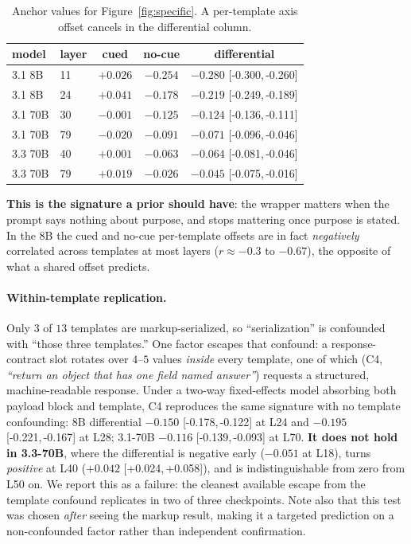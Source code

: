 \documentclass[10pt]{article}
\newcommand{\ci}[2]{{\footnotesize[#1,\,#2]}}
\begin{document}
\begin{table}[t]\centering\small
\caption{Anchor values for Figure~\ref{fig:specific}. A per-template axis offset
cancels in the differential column.}
\label{tab:diff}
\begin{tabular}{llccc}
\toprule
model & layer & cued & no-cue & differential \\
\midrule
3.1 8B  & 11 & $+0.026$ & $-0.254$ & $\mathbf{-0.280}$ \ci{-0.300}{-0.260}\\
3.1 8B  & 24 & $+0.041$ & $-0.178$ & $\mathbf{-0.219}$ \ci{-0.249}{-0.189}\\
3.1 70B & 30 & $-0.001$ & $-0.125$ & $\mathbf{-0.124}$ \ci{-0.136}{-0.111}\\
3.1 70B & 79 & $-0.020$ & $-0.091$ & $\mathbf{-0.071}$ \ci{-0.096}{-0.046}\\
3.3 70B & 40 & $+0.001$ & $-0.063$ & $\mathbf{-0.064}$ \ci{-0.081}{-0.046}\\
3.3 70B & 79 & $+0.019$ & $-0.026$ & $\mathbf{-0.045}$ \ci{-0.075}{-0.016}\\
\bottomrule
\end{tabular}
\end{table}

\textbf{This is the signature a prior should have}: the wrapper matters when the
prompt says nothing about purpose, and stops mattering once purpose is stated.
In the 8B the cued and no-cue per-template offsets are in fact \emph{negatively}
correlated across templates at most layers ($r \approx -0.3$ to $-0.67$), the
opposite of what a shared offset predicts.

\paragraph{Within-template replication.} Only $3$ of $13$ templates are
markup-serialized, so ``serialization'' is confounded with ``those three
templates.'' One factor escapes that confound: a response-contract slot rotates
over $4$--$5$ values \emph{inside} every template, one of which (\textsf{C4},
\emph{``return an object that has one field named answer''}) requests a
structured, machine-readable response. Under a two-way fixed-effects model
absorbing both payload block and template, \textsf{C4} reproduces the same
signature with no template confounding: 8B differential $-0.150$
\ci{-0.178}{-0.122} at L24 and $-0.195$ \ci{-0.221}{-0.167} at L28; 3.1-70B
$-0.116$ \ci{-0.139}{-0.093} at L70. \textbf{It does not hold in 3.3-70B}, where
the differential is negative early ($-0.051$ at L18), turns \emph{positive} at
L40 ($+0.042$ \ci{+0.024}{+0.058}), and is indistinguishable from zero from L50
on. We report this as a failure: the cleanest available escape from the template
confound replicates in two of three checkpoints. Note also that this test was
chosen \emph{after} seeing the markup result, making it a targeted prediction on
a non-confounded factor rather than independent confirmation.
\end{document}
